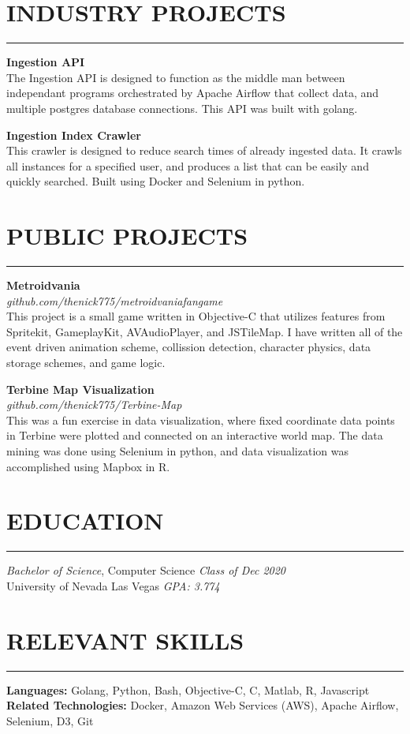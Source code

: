 \documentclass{res}
\begin{document}
\begin{resume}
		\section{{INDUSTRY PROJECTS}}
    \noindent\rule[0.5ex]{\linewidth}{1pt}
		{\bf Ingestion API} \hfill \vspace{3pt} \\
			The Ingestion API is designed to function as the middle man between independant programs orchestrated by Apache Airflow that collect data, and multiple postgres database connections. This API was built with golang.

		{\bf Ingestion Index Crawler} \hfill \vspace{3pt}\\
			This crawler is designed to reduce search times of already ingested data. It crawls all instances for a specified user, and produces a list that can be easily and quickly searched. Built using Docker and Selenium in python.

		\section{{PUBLIC PROJECTS}}
    \noindent\rule[0.5ex]{\linewidth}{1pt}
		{\bf Metroidvania} \\
			\emph{github.com/thenick775/metroidvaniafangame} \hfill \vspace{3pt}\\
			This project is a small game written in Objective-C that utilizes features from Spritekit, GameplayKit, AVAudioPlayer, and JSTileMap. I have written all of the event driven animation scheme, collission detection, character physics, data storage schemes, and game logic.

		{\bf Terbine Map Visualization} \\
			\emph{github.com/thenick775/Terbine-Map} \hfill \vspace{3pt} \\
			This was a fun exercise in data visualization, where fixed coordinate data points in Terbine were plotted and connected on an interactive world map. The data mining was done using Selenium in python, and data visualization was accomplished using Mapbox in R.

		\section{{EDUCATION}}
    \noindent\rule[0.5ex]{\linewidth}{1pt}
		{\sl Bachelor of Science}, Computer Science \hfill \emph{Class of Dec 2020} \\
		University of Nevada Las Vegas \hfill \emph{GPA: 3.774} \\ \vspace{-4mm}

		\section{{RELEVANT SKILLS}}
    \noindent\rule[0.5ex]{\linewidth}{1pt}
			{\bf Languages:} Golang, Python, Bash, Objective-C, C, Matlab, R, Javascript \\
			{\bf Related Technologies:} Docker, Amazon Web Services (AWS), Apache Airflow, Selenium, D3, Git

	\end{resume}
\end{document}
